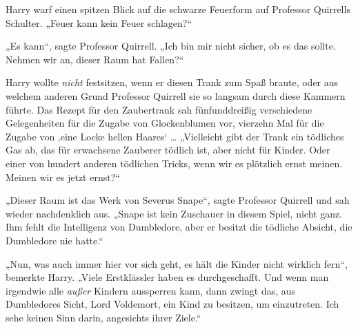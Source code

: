 Harry warf einen spitzen Blick auf die schwarze Feuerform auf Professor Quirrells Schulter.
„Feuer kann kein Feuer schlagen?“

„Es kann“, sagte Professor Quirrell.
„Ich bin mir nicht sicher, ob es das sollte. Nehmen wir an, dieser Raum hat Fallen?“

Harry wollte \emph{nicht} festsitzen, wenn er diesen Trank zum Spaß braute, oder aus welchem anderen Grund Professor Quirrell sie so langsam durch diese Kammern führte. Das Rezept für den Zaubertrank sah fünfunddreißig verschiedene Gelegenheiten für die Zugabe von Glockenblumen vor, vierzehn Mal für die Zugabe von
‚eine Locke hellen Haares‘ …
„Vielleicht gibt der Trank ein tödliches Gas ab, das für erwachsene Zauberer tödlich ist, aber nicht für Kinder. Oder einer von hundert anderen tödlichen Tricks, wenn wir es plötzlich ernst meinen. Meinen wir es jetzt ernst?“

„Dieser Raum ist das Werk von Severus Snape“, sagte Professor Quirrell und sah wieder nachdenklich aus.
„Snape ist kein Zuschauer in diesem Spiel, nicht ganz. Ihm fehlt die Intelligenz von Dumbledore, aber er besitzt die tödliche Absicht, die Dumbledore nie hatte.“

„Nun, was auch immer hier vor sich geht, es hält die Kinder nicht wirklich fern“, bemerkte Harry.
„Viele Erstklässler haben es durchgeschafft. Und wenn man irgendwie alle \emph{außer} Kindern aussperren kann, dann zwingt das, aus Dumbledores Sicht, Lord Voldemort, ein Kind zu besitzen, um einzutreten. Ich sehe keinen Sinn darin, angesichts ihrer Ziele.“

